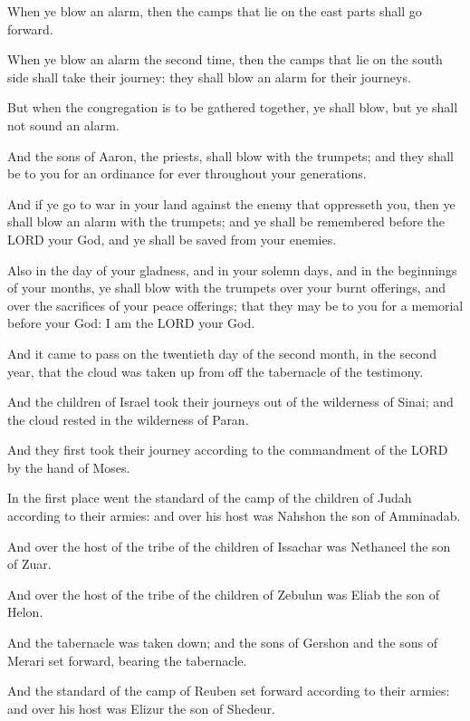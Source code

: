 \Verse When ye blow an alarm, then the camps that lie on the east parts
shall go forward.

\Verse When ye blow an alarm the second time, then the camps that lie on
the south side shall take their journey: they shall blow an alarm for
their journeys.

\Verse But when the congregation is to be gathered together, ye shall
blow, but ye shall not sound an alarm.

\Verse And the sons of Aaron, the priests, shall blow with the trumpets;
and they shall be to you for an ordinance for ever throughout your
generations.

\Verse And if ye go to war in your land against the enemy that
oppresseth you, then ye shall blow an alarm with the trumpets; and ye
shall be remembered before the LORD your God, and ye shall be saved
from your enemies.

\Verse Also in the day of your gladness, and in your solemn days, and
in the beginnings of your months, ye shall blow with the trumpets over
your burnt offerings, and over the sacrifices of your peace offerings;
that they may be to you for a memorial before your God: I am the LORD
your God.

\Verse And it came to pass on the twentieth day of the second month, in
the second year, that the cloud was taken up from off the tabernacle
of the testimony.

\Verse And the children of Israel took their journeys out of the
wilderness of Sinai; and the cloud rested in the wilderness of Paran.

\Verse And they first took their journey according to the commandment
of the LORD by the hand of Moses.

\Verse In the first place went the standard of the camp of the children
of Judah according to their armies: and over his host was Nahshon the
son of Amminadab.

\Verse And over the host of the tribe of the children of Issachar was
Nethaneel the son of Zuar.

\Verse And over the host of the tribe of the children of Zebulun was
Eliab the son of Helon.

\Verse And the tabernacle was taken down; and the sons of Gershon and
the sons of Merari set forward, bearing the tabernacle.

\Verse And the standard of the camp of Reuben set forward according to
their armies: and over his host was Elizur the son of Shedeur.

